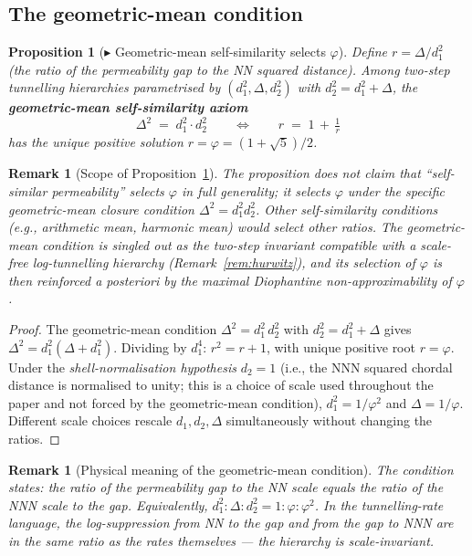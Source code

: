 \documentclass[12pt]{article}
\newtheorem{proposition}[theorem]{Proposition}
\newtheorem{remark}[theorem]{Remark}
\newcommand{\phig}{\varphi}
\begin{document}
\subsection{The geometric-mean condition}

\begin{proposition}[$\blacktriangleright$ Geometric-mean self-similarity selects $\phig$]\label{prop:phi}
Define $r = \Delta/d_1^2$ (the ratio of the permeability gap to the
NN squared distance). Among two-step tunnelling hierarchies
parametrised by $(d_1^2, \Delta, d_2^2)$ with $d_2^2 = d_1^2 +
\Delta$, the \textbf{geometric-mean self-similarity axiom}
\begin{equation}\label{eq:geomean}
    \Delta^2 \;=\; d_1^2 \cdot d_2^2 \qquad\Longleftrightarrow\qquad
    r \;=\; 1 \,+\, \tfrac{1}{r}
\end{equation}
has the unique positive solution $r = \phig = (1+\sqrt{5})/2$.
\end{proposition}

\begin{remark}[Scope of Proposition~\ref{prop:phi}]
The proposition does not claim that ``self-similar permeability''
selects $\phig$ in full generality; it selects $\phig$ under the
specific geometric-mean closure condition $\Delta^2 = d_1^2 d_2^2$.
Other self-similarity conditions (e.g., arithmetic mean, harmonic
mean) would select other ratios. The geometric-mean condition is
singled out as the two-step invariant compatible with a
scale-free log-tunnelling hierarchy (Remark~\ref{rem:hurwitz}), and
its selection of $\phig$ is then reinforced \textit{a posteriori}
by the maximal Diophantine non-approximability of $\phig$.
\end{remark}

\begin{proof}
The geometric-mean condition $\Delta^2 = d_1^2\,d_2^2$ with
$d_2^2 = d_1^2 + \Delta$ gives $\Delta^2 = d_1^2(\Delta + d_1^2)$.
Dividing by $d_1^4$: $r^2 = r + 1$, with unique positive root
$r = \phig$. Under the \emph{shell-normalisation hypothesis} $d_2 = 1$ (i.e., the NNN squared chordal distance is normalised to unity; this is a choice of scale used throughout the paper and not forced by the geometric-mean condition), $d_1^2 = 1/\phig^2$ and $\Delta = 1/\phig$. Different scale choices rescale $d_1, d_2, \Delta$ simultaneously without changing the ratios.
\end{proof}

\begin{remark}[Physical meaning of the geometric-mean condition]
The condition states: \textit{the ratio of the permeability gap to the NN
scale equals the ratio of the NNN scale to the gap}. Equivalently,
$d_1^2 : \Delta : d_2^2 = 1 : \phig : \phig^2$. In the tunnelling-rate
language, the log-suppression from NN to the gap and from the gap to NNN
are in the same ratio as the rates themselves --- the hierarchy is
scale-invariant.
\end{remark}
\end{document}

